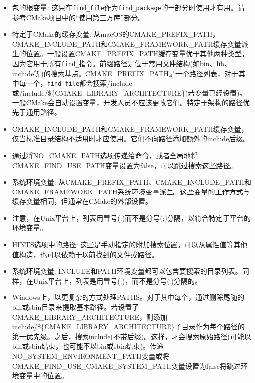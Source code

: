 \begin{itemize}
\item 
包的根变量: 这只在\texttt{find\_file}作为\texttt{find\_package}的一部分时使用才有用。请参考CMake项目中的“使用第三方库”部分。

\item 
特定于CMake的缓存变量: 从macOS的CMAKE\_PREFIX\_PATH，CMAKE\_INCLUDE\_PATH和CMAKE\_FRAMEWORK\_PATH缓存变量派生的位置。一般设置CMAKE\_PREFIX\_PATH缓存变量优于其他两种类型，因为它用于所有\texttt{find\_}指令。前缀路径是位于常用文件结构(如bin、lib、include等)的搜索基点。CMAKE\_PREFIX\_PATH是一个路径列表，对于其中每一个，\texttt{find\_file}都会搜索/include或/include/\$\{CMAKE\_LIBRARY\_ARCHITECTURE\}(若变量已经设置)。一般CMake会自动设置变量，开发人员不应该更改它们。特定于架构的路径优先于通用路径。

\item 
CMAKE\_INCLUDE\_PATH和CMAKE\_FRAMEWORK\_PATH缓存变量，仅当标准目录结构不适用时才应使用。它们不向路径添加额外的include后缀。

\item 
通过将NO\_CMAKE\_PATH选项传递给命令，或者全局地将CMAKE\_FIND\_USE\_PATH变量设置为false，可以跳过搜索这些路径。

\item 
系统环境变量: 从CMAKE\_PREFIX\_PATH、CMAKE\_INCLUDE\_PATH和CMAKE\_FRAMEWORK\_PATH系统环境变量派生。这些变量的工作方式与缓存变量相同，但通常在CMake的外部设置。

\item 
注意，在Unix平台上，列表用冒号(:)而不是分号(;)分隔，以符合特定于平台的环境变量。

\item 
HINTS选项中的路径: 这些是手动指定的附加搜索位置。可以从属性值等其他值构造，也可以依赖于以前找到的文件或路径。

\item 
系统环境变量: INCLUDE和PATH环境变量都可以包含要搜索的目录列表。同样，在Unix平台上，列表是用冒号(:)，而不是分号(;)分隔的。

\item 
Windows上，以更复杂的方式处理PATHS。对于其中每个，通过删除尾随的bin或sbin目录来提取基本路径。若设置了CMAKE\_LIBRARY\_ARCHITECTURE，则添加include/\$\{CMAKE\_LIBRARY\_ARCHITECTURE\}子目录作为每个路径的第一优先级。之后，搜索include(不带后缀)。这样，才会搜索原始路径(可能以bin或sbin结束，也可能不以bin或sbin结束)。传递NO\_SYSTEM\_ENVIRONMENT\_PATH变量或将CMAKE\_FIND\_USE\_CMAKE\_SYSTEM\_PATH变量设置为false将跳过环境变量中的位置。


\end{itemize}
